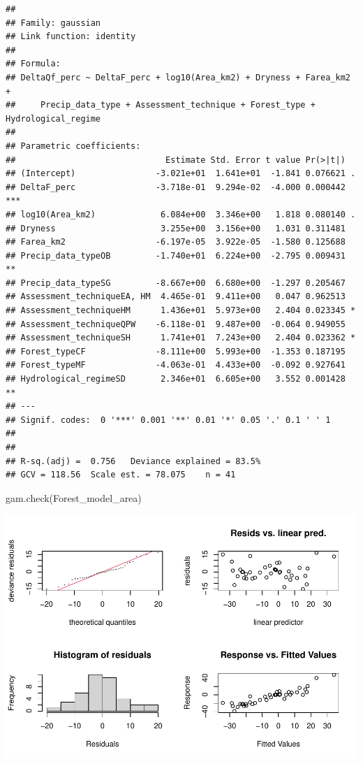 \documentclass[]{elsarticle} %
\newenvironment{Shaded}{\begin{snugshade}}{\end{snugshade}}
\newcommand{\FunctionTok}[1]{\textcolor[rgb]{0.00,0.00,0.00}{#1}}
\newcommand{\NormalTok}[1]{#1}
\begin{document}
\begin{verbatim}
## 
## Family: gaussian 
## Link function: identity 
## 
## Formula:
## DeltaQf_perc ~ DeltaF_perc + log10(Area_km2) + Dryness + Farea_km2 + 
##     Precip_data_type + Assessment_technique + Forest_type + Hydrological_regime
## 
## Parametric coefficients:
##                              Estimate Std. Error t value Pr(>|t|)    
## (Intercept)                -3.021e+01  1.641e+01  -1.841 0.076621 .  
## DeltaF_perc                -3.718e-01  9.294e-02  -4.000 0.000442 ***
## log10(Area_km2)             6.084e+00  3.346e+00   1.818 0.080140 .  
## Dryness                     3.255e+00  3.156e+00   1.031 0.311481    
## Farea_km2                  -6.197e-05  3.922e-05  -1.580 0.125688    
## Precip_data_typeOB         -1.740e+01  6.224e+00  -2.795 0.009431 ** 
## Precip_data_typeSG         -8.667e+00  6.680e+00  -1.297 0.205467    
## Assessment_techniqueEA, HM  4.465e-01  9.411e+00   0.047 0.962513    
## Assessment_techniqueHM      1.436e+01  5.973e+00   2.404 0.023345 *  
## Assessment_techniqueQPW    -6.118e-01  9.487e+00  -0.064 0.949055    
## Assessment_techniqueSH      1.741e+01  7.243e+00   2.404 0.023362 *  
## Forest_typeCF              -8.111e+00  5.993e+00  -1.353 0.187195    
## Forest_typeMF              -4.063e-01  4.433e+00  -0.092 0.927641    
## Hydrological_regimeSD       2.346e+01  6.605e+00   3.552 0.001428 ** 
## ---
## Signif. codes:  0 '***' 0.001 '**' 0.01 '*' 0.05 '.' 0.1 ' ' 1
## 
## 
## R-sq.(adj) =  0.756   Deviance explained = 83.5%
## GCV = 118.56  Scale est. = 78.075    n = 41
\end{verbatim}

\begin{Shaded}
\begin{Highlighting}[]
\FunctionTok{gam.check}\NormalTok{(Forest\_model\_area)}
\end{Highlighting}
\end{Shaded}

\includegraphics{Test_model_totalForestArea_files/figure-latex/check_resid_area-1.pdf}
\end{document}
